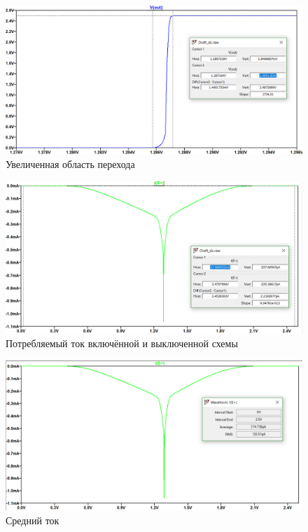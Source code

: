 \documentclass[a4paper,14pt]{article}
\begin{document}
\begin{figure}[H]
	\centering		
	\includegraphics[width=\linewidth]{image/dc_V}
	\caption{Увеличенная область перехода}\label{img:dc_V}
\end{figure}

\begin{figure}[H]
	\centering		
	\includegraphics[width=\linewidth]{image/dc_I}
	\caption{Потребляемый ток включённой и выключенной схемы}\label{img:dc_I}
\end{figure}

\begin{figure}[H]
	\centering		
	\includegraphics[width=\linewidth]{image/dc_I_avg}
	\caption{Средний ток}\label{img:dc_I_avg}
\end{figure}
\end{document}
